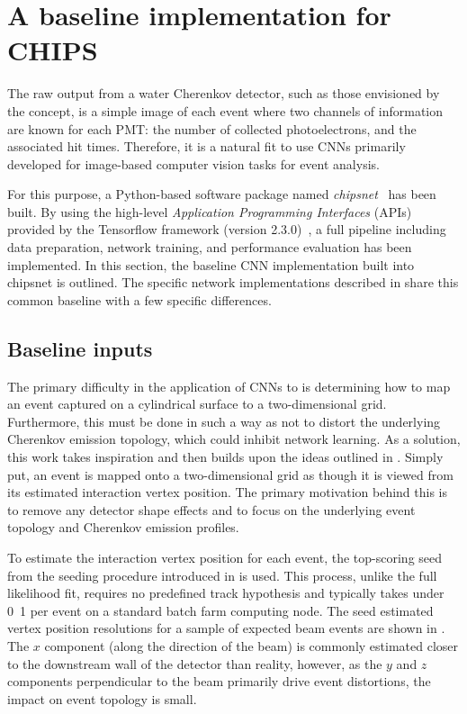\section{A baseline implementation for CHIPS} %
\label{sec:cnn_baseline} %

The raw output from a water Cherenkov detector, such as those envisioned by the \chips concept, is
a simple image of each event where two channels of information are known for each PMT: the number
of collected photoelectrons, and the associated hit times. Therefore, it is a natural fit to use
CNNs primarily developed for image-based computer vision tasks for \chips event analysis.

For this purpose, a Python-based software package named \emph{chipsnet}~\cite{chipsnet2020} has
been built. By using the high-level \emph{Application Programming Interfaces} (APIs) provided by
the Tensorflow framework (version 2.3.0)~\cite{tf2015}, a full pipeline including data
preparation, network training, and performance evaluation has been implemented. In this section,
the baseline CNN implementation built into chipsnet is outlined. The specific network
implementations described in  share this common baseline with a few
specific differences.

\subsection{Baseline inputs} %
\label{sec:cnn_baseline_inputs} %

The primary difficulty in the application of CNNs to \chips is determining how to map an event
captured on a cylindrical surface to a two-dimensional grid. Furthermore, this must be done in
such a way as not to distort the underlying Cherenkov emission topology, which could inhibit
network learning. As a solution, this work takes inspiration and then builds upon the ideas
outlined in . Simply put, an event is mapped onto a two-dimensional
grid as though it is viewed from its estimated interaction vertex position. The primary motivation
behind this is to remove any detector shape effects and to focus on the underlying event topology
and Cherenkov emission profiles.

To estimate the interaction vertex position for each event, the top-scoring seed from the seeding
procedure introduced in  is used. This process, unlike the full
likelihood fit, requires no predefined track hypothesis and typically takes under
\unit{0.1}{} per event on a standard batch farm computing node. The seed estimated
vertex position resolutions for a sample of expected beam events are shown in
. The $x$ component (along the direction of the beam) is
commonly estimated closer to the downstream wall of the detector than reality, however, as the $y$
and $z$ components perpendicular to the beam primarily drive event distortions, the impact on
event topology is small.

